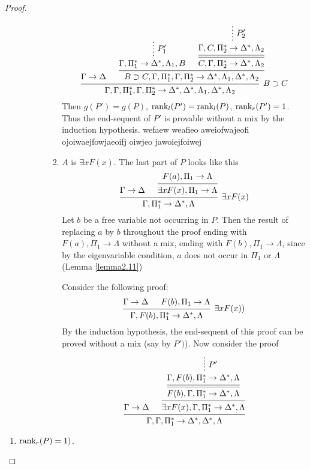 \documentclass[11pt]{article}
\begin{document}
\begin{proof}
\begin{enumerate}
\begin{enumerate}
\begin{enumerate}
\begin{enumerate}
\begin{equation*}
\begin{prooftree}
\hypo{\Gamma\to\Delta}
\hypo{}
\ellipsis{\(P_1'\)}{\Gamma,\Pi_1^*\to\Delta^*,\Lambda_1,B}
\hypo{}
\ellipsis{\(P_2'\)}{\Gamma,C,\Pi_2^*\to\Delta^*,\Lambda_2}
\infer[double]1{C,\Gamma,\Pi_2^*\to\Delta^*,\Lambda_2}
\infer2{B\supset C,\Gamma,\Pi_1^*,\Gamma,\Pi_2^*\to\Delta^*,\Lambda_1,
\Delta^*,\Lambda_2}
\infer2[\(B\supset C\)]{\Gamma,\Gamma,\Pi_1^*,\Gamma,\Pi_2^*\to\Delta^*,
\Delta^*,\Lambda_1,\Delta^*,\Lambda_2}
\end{prooftree}
\end{equation*}
Then \(g(P')=g(P)\), \(\text{rank}_l(P')=\text{rank}_l(P)\), \(\text{rank}_r(P')=1\). Thus the
end-sequent of \(P'\) is provable without a mix by the induction hypothesis.
wefaew weafieo aweiofwajeofi ojoiwaejfowjaeoifj oiwjeo jawoiejfoiwej

\item \(A\) is \(\exists xF(x)\). The last part of \(P\) looks like this
\begin{equation*}
\begin{prooftree}%
\hypo{\Gamma\to\Delta}
\hypo{F(a),\Pi_1\to\Lambda}
\infer1{\exists xF(x),\Pi_1\to\Lambda}
\infer2[\(\exists xF(x)\)]{\Gamma,\Pi_1^*\to\Delta^*,\Lambda}
\end{prooftree}
\end{equation*}
Let \(b\) be a free variable not occurring in \(P\). Then the result of
replacing \(a\) by \(b\) throughout the proof ending with \(F(a),\Pi_1\to\Lambda\)
without a mix, ending with \(F(b),\Pi_1\to\Lambda\), since by the eigenvariable
condition, \(a\) does not occur in \(\Pi_1\) or \(\Lambda\) (Lemma \ref{lemma2.11})

Consider the following proof:
\begin{equation*}
\begin{prooftree}%
\hypo{\Gamma\to\Delta}
\hypo{F(b),\Pi_1\to\Lambda}
\infer2[\(\exists xF(x))\)]{\Gamma,F(b),\Pi^*_1\to\Delta^*,\Lambda}
\end{prooftree}
\end{equation*}
By the induction hypothesis, the end-sequent of this proof can be proved without a
mix (say by \(P')\)). Now consider the proof
\begin{equation*} 
\begin{prooftree}%
\hypo{\Gamma\to\Delta}
\hypo{}
\ellipsis{\(P'\)}{\Gamma,F(b),\Pi_1^*\to\Delta^*,\Lambda}
\infer[double]1{F(b),\Gamma,\Pi_1^*\to\Delta^*,\Lambda}
\infer1{\exists xF(x),\Gamma,\Pi_1^*\to\Delta^*,\Lambda}
\infer2{\Gamma,\Gamma,\Pi_1^*\to\Delta^*,\Delta^*,\Lambda}
\end{prooftree}
\end{equation*}
\end{enumerate}
\end{enumerate}
\end{enumerate}
\end{enumerate}


\begin{enumerate}
\item \(\text{rank}_r(P)=1)\).
\end{enumerate}
\end{proof}
\end{document}
